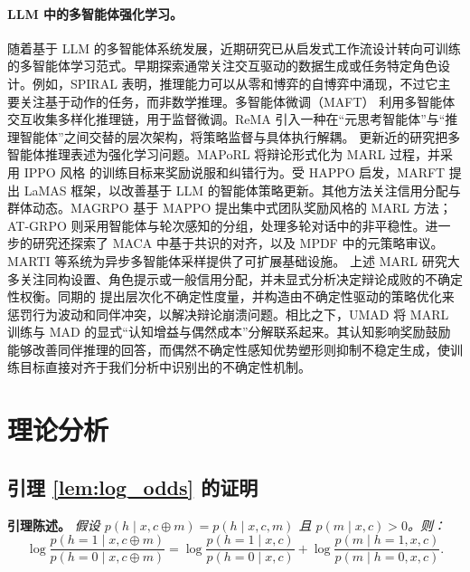 \documentclass{article}
\theoremstyle{plain}
\theoremstyle{definition}
\theoremstyle{remark}
\begin{document}
\paragraph{LLM 中的多智能体强化学习。}
随着基于 LLM 的多智能体系统发展，近期研究已从启发式工作流设计转向可训练的多智能体学习范式。早期探索通常关注交互驱动的数据生成或任务特定角色设计。例如，SPIRAL \cite{liu2025spiral} 表明，推理能力可以从零和博弈的自博弈中涌现，不过它主要关注基于动作的任务，而非数学推理。多智能体微调（MAFT）\cite{subramaniam2025multiagent} 利用多智能体交互收集多样化推理链，用于监督微调。ReMA \cite{wan2025rema} 引入一种在“元思考智能体”与“推理智能体”之间交替的层次架构，将策略监督与具体执行解耦。
更新近的研究把多智能体推理表述为强化学习问题。MAPoRL \cite{park2025maporl} 将辩论形式化为 MARL 过程，并采用 IPPO 风格 \cite{de2020independent} 的训练目标来奖励说服和纠错行为。受 HAPPO \cite{kuba2021trust} 启发，MARFT \cite{liao2025marft} 提出 LaMAS 框架，以改善基于 LLM 的智能体策略更新。其他方法关注信用分配与群体动态。MAGRPO \cite{liu2025llm} 基于 MAPPO \cite{yu2022surprising} 提出集中式团队奖励风格的 MARL 方法；AT-GRPO \cite{zhao2025stronger} 则采用智能体与轮次感知的分组，处理多轮对话中的非平稳性。进一步的研究还探索了 MACA \cite{samanta2025self} 中基于共识的对齐，以及 MPDF \cite{yang2025learning} 中的元策略审议。MARTI \cite{zhang2025marti} 等系统为异步多智能体采样提供了可扩展基础设施。
上述 MARL 研究大多关注同构设置、角色提示或一般信用分配，并未显式分析决定辩论成败的不确定性权衡。同期的 \citet{tang2026value} 提出层次化不确定性度量，并构造由不确定性驱动的策略优化来惩罚行为波动和同伴冲突，以解决辩论崩溃问题。相比之下，UMAD 将 MARL 训练与 MAD 的显式“认知增益与偶然成本”分解联系起来。其认知影响奖励鼓励能够改善同伴推理的回答，而偶然不确定性感知优势塑形则抑制不稳定生成，使训练目标直接对齐于我们分析中识别出的不确定性机制。


\section{理论分析}


\subsection{引理 \ref{lem:log_odds} 的证明}\label{app:proof_lemma1}
\textbf{引理陈述。}
\textit{
假设 $p(h \mid x, c \oplus m) = p(h \mid x, c, m)$ 且 $p(m \mid x, c) > 0$。则：
\[
\log \frac{p(h=1 \mid x, c \oplus m)}{p(h=0 \mid x, c \oplus m)}
=
\log \frac{p(h=1 \mid x, c)}{p(h=0 \mid x, c)}
+
\log \frac{p(m \mid h=1, x, c)}{p(m \mid h=0, x, c)}.
\]
}
\end{document}
